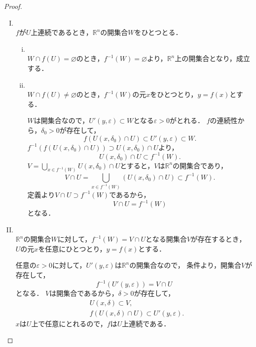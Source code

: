 \documentclass[a4paper,10pt,fleqn]{ltjsarticle}
\begin{document}
    \begin{leftbar}
    \begin{proof} \mbox{　}
      \begin{enumerate}[(I)]
        \item \mbox{} \\
    $f$が$U$上連続であるとき，$\mathbb{R}^n$の開集合$W$をひとつとる．
    \begin{enumerate}[(i)]
      \item \mbox{} \\
    $W \cap f(U) = \varnothing$のとき，$f^{-1} (W) = \varnothing$より，$\mathbb{R}^n$上の開集合となり，成立する．
    \item \mbox{} \\
    $W \cap f(U) \ne \varnothing$のとき，$f^{-1} (W)$の元$x$をひとつとり，$y=f(x)$とする．
    
    $W$は開集合なので，$U'(y,\varepsilon) \subset W$となる$\varepsilon >0$がとれる．
    $f$の連続性から，$\delta_0 >0$が存在して，
    \[
    f(U(x,\delta_0) \cap U) \subset U'(y,\varepsilon) \subset W.
    \]
    $f^{-1} (f(U(x,\delta_0) \cap U)) \supset U(x,\delta_0) \cap U$より，
    \[
    U(x,\delta_0) \cap U \subset f^{-1} (W).
    \]
    $V = \bigcup_{x \in f^{-1}(W)} U(x,\delta_0) \cap U$とすると，$V$は$\mathbb{R}^n$の開集合であり，
    \[
     V \cap U = \bigcup_{x \in f^{-1}(W)} (U(x,\delta_0) \cap U)  \subset f^{-1} (W).
    \]
    定義より$V \cap U \supset f^{-1} (W)$であるから，
    \[
    V \cap U = f^{-1} (W)
    \]
    となる．
    \end{enumerate}
    \item \mbox{} \\
    $\mathbb{R}^n$の開集合$W$に対して，$f^{-1}(W)=V \cap U$となる開集合$V$が存在するとき，
    $U$の元$x$を任意にひとつとり，$y=f(x)$とする．
    
    任意の$\varepsilon >0$に対して，$U'(y,\varepsilon)$は$\mathbb{R}^n$の開集合なので，
    条件より，開集合$V$が存在して，
    \[
    f^{-1} (U'(y,\varepsilon)) = V \cap U
    \]
    となる．
    $V$は開集合であるから，$\delta >0$が存在して，
    \begin{align*} 
      &U(x,\delta)  \subset V, \\
      &f(U(x,\delta) \cap U) \subset U'(y,\varepsilon).
    \end{align*}
    $x$は$U$上で任意にとれるので，$f$は$U$上連続である．
    \end{enumerate}
    \end{proof}
    \end{leftbar}
    
\end{document}
